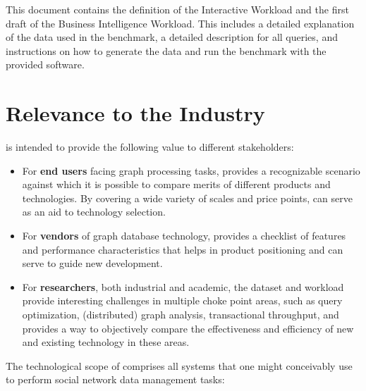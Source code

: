 This document contains the definition of the Interactive Workload and the first
draft of the Business Intelligence Workload. This includes a detailed
explanation of the data used in the \ldbcsnb benchmark, a detailed description
for all queries, and instructions on how to generate the data and run the
benchmark with the provided software.


\section{Relevance to the Industry}

\ldbcsnb is intended to provide the following value to different stakeholders:

\begin{itemize}
 \item For \textbf{end users} facing graph processing tasks, \ldbcsnb provides
     a recognizable scenario against which it is possible to compare merits of
     different products and technologies.  By covering a wide variety of scales
     and price points, \ldbcsnb can serve as an aid to technology selection.
 \item For \textbf{vendors} of graph database technology, \ldbcsnb provides a
     checklist of features and performance characteristics that helps in
     product positioning and can serve to guide new development.
 \item For \textbf{researchers}, both industrial and academic, the \ldbcsnb
     dataset and workload provide interesting challenges in multiple
     choke point areas, such as query optimization, (distributed) graph
     analysis, transactional throughput, and provides a way to objectively
     compare the effectiveness and efficiency of new and existing technology in
     these areas.
\end{itemize}

The technological scope of \ldbcsnb comprises all systems that one might
conceivably use to perform social network data management tasks:

